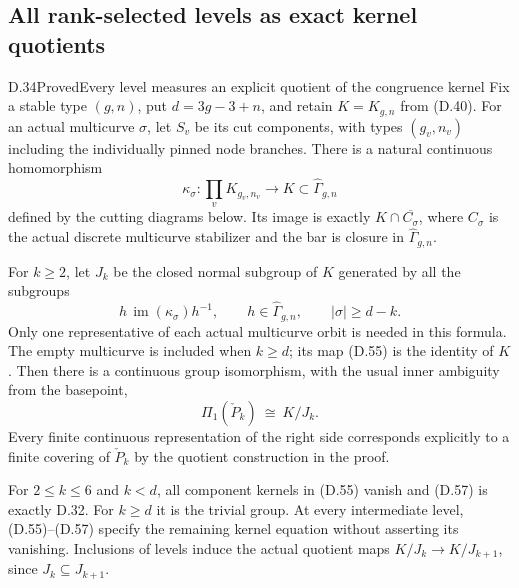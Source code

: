\subsection{All rank-selected levels as exact kernel quotients}

\begin{result}{D.34}{Proved}{Every level measures an explicit quotient of the congruence kernel}
Fix a stable type $(g,n)$, put $d=3g-3+n$, and retain
$K=K_{g,n}$ from (D.40).  For an actual multicurve $\sigma$,
let $S_v$ be its cut components, with types $(g_v,n_v)$
including the individually pinned node branches.
There is a natural continuous homomorphism
\[
 \kappa_\sigma:\prod_v K_{g_v,n_v}
                  \longrightarrow K\subset\widehat\Gamma_{g,n}
                                                               \tag{D.55}
\]
defined by the cutting diagrams below.  Its image is exactly
$K\cap\overline{C_\sigma}$, where $C_\sigma$ is the actual
discrete multicurve stabilizer and the bar is closure in
$\widehat\Gamma_{g,n}$.

For $k\geq2$, let $J_k$ be the closed normal subgroup of $K$
generated by all the subgroups
\[
 h\,\operatorname{im}(\kappa_\sigma)h^{-1},
 \qquad h\in\widehat\Gamma_{g,n},\qquad
                         |\sigma|\geq d-k.                  \tag{D.56}
\]
Only one representative of each actual multicurve orbit is
needed in this formula.  The empty multicurve is included
when $k\geq d$; its map (D.55) is the identity of $K$.
Then there is a continuous group isomorphism, with the usual
inner ambiguity from the basepoint,
\[
               \Pi_1(\check P_k)\ \cong\ K/J_k.             \tag{D.57}
\]
Every finite continuous representation of the right side
corresponds explicitly to a finite covering of $\check P_k$
by the quotient construction in the proof.

For $2\leq k\leq6$ and $k<d$, all component kernels in
(D.55) vanish and (D.57) is exactly D.32.  For $k\geq d$
it is the trivial group.  At every intermediate level,
(D.55)--(D.57) specify the remaining kernel equation without
asserting its vanishing.  Inclusions of levels induce the
actual quotient maps $K/J_k\to K/J_{k+1}$, since
$J_k\subseteq J_{k+1}$.
\end{result}
